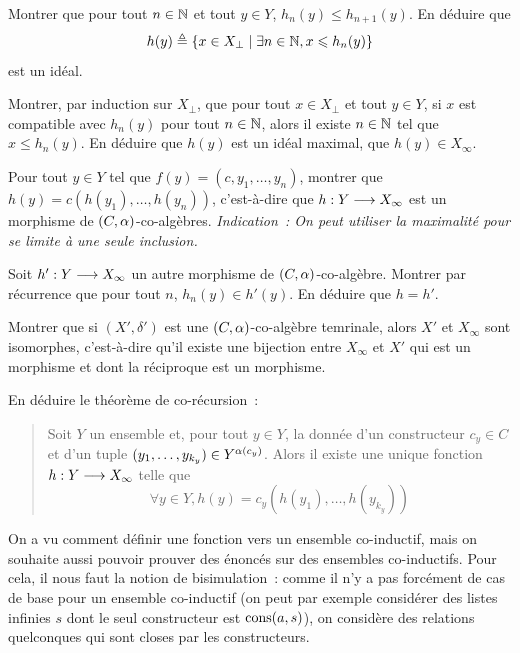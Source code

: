 \begin{problem}[La coinduction]
  \begin{pbQuest}[resume]
  \item Montrer que pour tout $n\in\mathbb N$ et tout $y\in Y$,
    $h_n(y) \leq h_{n+1}(y)$. En déduire que
    \[h(y) \triangleq \left\{ x\in X_\bot \;\middle\vert\; \exists n\in \mathbb N, x \leqslant h_n(y) \right\}\]
    est un idéal.
  \item Montrer, par induction sur $X_\bot$, que pour tout $x\in X_\bot$ et tout
    $y\in Y$, si $x$ est compatible avec $h_n(y)$ pour tout $n\in \mathbb N$, alors
    il existe $n \in \mathbb N$ tel que $x \leq h_n(y)$. En déduire que $h(y)$ est un
    idéal maximal,  que $h(y) \in X_\infty$.
  \item Pour tout $y \in Y$ tel que $f(y) = (c,y_1,\ldots,y_n)$, montrer que
    $h(y) = c(h(y_1),\ldots,h(y_n))$, c'est-à-dire que
    $h : \displaystyle Y \longrightarrow X_\infty$ est un morphisme de $(C,\alpha)$-co-algèbres.
    \textit{Indication~: On peut utiliser la maximalité pour se limite à une
      seule inclusion.}
  \item Soit $h' : \displaystyle Y \longrightarrow X_\infty$ un autre morphisme de
    $(C,\alpha)$-co-algèbre. Montrer par récurrence que pour tout $n$,
    $h_n(y) \in h'(y)$. En déduire que $h= h'$.
  \item Montrer que si $(X',\delta')$ est une $(C,\alpha)$-co-algèbre temrinale,
    alors $X'$ et $X_\infty$ sont isomorphes, c'est-à-dire qu'il existe une
    bijection entre $X_\infty$ et $X'$ qui est un morphisme et dont la
    réciproque est un morphisme.
  \item En déduire le théorème de co-récursion~:
    \begin{quotation}
      \noindent
      Soit $Y$ un ensemble et, pour tout $y\in Y$, la donnée d'un constructeur
      $c_y\in C$ et d'un tuple $(y_1,\ldots,y_{k_y})\in Y^{\alpha(c_y)}$. Alors il
      existe une unique fonction $h : \displaystyle Y \longrightarrow X_\infty$ telle que
      \[\forall y \in Y, h(y) = c_y (h(y_1),\ldots,h(y_{k_y}))\]
    \end{quotation}
  \end{pbQuest}


  On a vu comment définir une fonction vers un ensemble co-inductif, mais on
  souhaite aussi pouvoir prouver des énoncés sur des ensembles co-inductifs.
  Pour cela, il nous faut la notion de bisimulation~: comme il n'y a pas
  forcément de cas de base pour un ensemble co-inductif (on peut par exemple
  considérer des listes infinies $s$ dont le seul constructeur est
  $\operatorname{cons}(a,s)$), on considère des relations quelconques qui sont closes par les
  constructeurs.


\end{problem}
